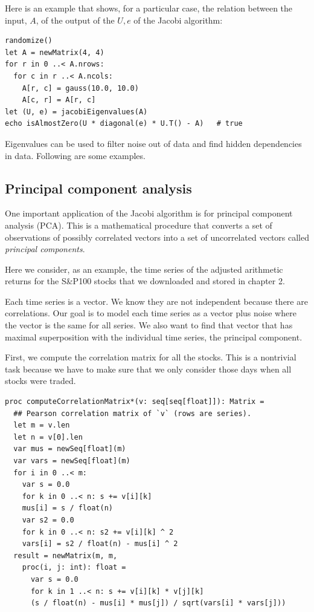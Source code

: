 \documentclass[justified, sixbynine]{tufte-book}
\def\ft{\small\tt}
\theoremstyle{plain}%
\newtheorem * {corollary}{Corollary}
\theoremstyle{definition}
\theoremstyle{remark}
\newtheorem * {remark}{Remark}
\newtheorem * {note}{Note}
\begin{document}
\begin{fullwidth}
Here is an example that shows, for a particular case, the relation between the input, $A$, of the output of the $U, e$ of the Jacobi algorithm:

\begin{lstlisting}
randomize()
let A = newMatrix(4, 4)
for r in 0 ..< A.nrows:
  for c in r ..< A.ncols:
    A[r, c] = gauss(10.0, 10.0)
    A[c, r] = A[r, c]
let (U, e) = jacobiEigenvalues(A)
echo isAlmostZero(U * diagonal(e) * U.T() - A)   # true
\end{lstlisting}

Eigenvalues can be used to filter noise out of data and find hidden dependencies in data. Following are some examples.

\goodbreak\subsection{Principal component analysis}


One important application of the Jacobi algorithm is for principal component analysis (PCA). This is a mathematical procedure that converts a set of observations of possibly correlated vectors into a set of uncorrelated vectors called {\it principal components}.

Here we consider, as an example, the time series of the adjusted arithmetic returns for the S\&P100 stocks that we downloaded and stored in chapter 2.

Each time series is a vector. We know they are not independent because there are correlations. Our goal is to model each time series as a vector plus noise where the vector is the same for all series. We also want to find that vector that has maximal superposition with the individual time series, the principal component.

First, we compute the correlation matrix for all the stocks. This is a nontrivial task because we have to make sure that we only consider those days when all stocks were traded. %


\begin{lstlisting}[caption={in file: {\ft nlib/linalg.nim}}]
proc computeCorrelationMatrix*(v: seq[seq[float]]): Matrix =
  ## Pearson correlation matrix of `v` (rows are series).
  let m = v.len
  let n = v[0].len
  var mus = newSeq[float](m)
  var vars = newSeq[float](m)
  for i in 0 ..< m:
    var s = 0.0
    for k in 0 ..< n: s += v[i][k]
    mus[i] = s / float(n)
    var s2 = 0.0
    for k in 0 ..< n: s2 += v[i][k] ^ 2
    vars[i] = s2 / float(n) - mus[i] ^ 2
  result = newMatrix(m, m,
    proc(i, j: int): float =
      var s = 0.0
      for k in 1 ..< n: s += v[i][k] * v[j][k]
      (s / float(n) - mus[i] * mus[j]) / sqrt(vars[i] * vars[j]))
\end{lstlisting}


\end{fullwidth}
\end{document}

